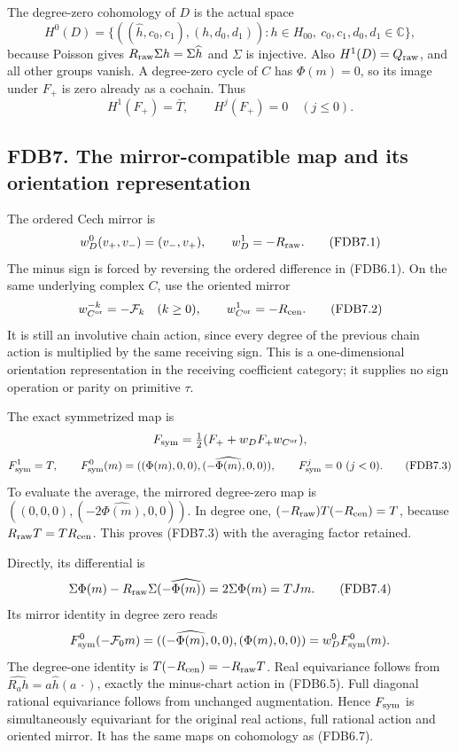 The degree-zero cohomology of \(D\) is the actual space \[
H^0(D)=\{((\widehat h,c_0,c_1),(h,d_0,d_1)):
h\in H_{00},\ c_0,c_1,d_0,d_1\in\mathbb C\},
\tag{FDB6.6}
\] because Poisson gives \(R_{\rm raw}\Sigma h=\Sigma\widehat h\) and
\(\Sigma\) is injective. Also \(H^1(D)=Q_{\rm raw}\), and all other
groups vanish. A degree-zero cycle of \(C\) has \(\Phi(m)=0\), so its
image under \(F_+\) is zero already as a cochain. Thus \[
H^1(F_+)=\bar T,\qquad H^j(F_+)=0\quad(j\le0).
\tag{FDB6.7}
\]

\subsection{FDB7. The mirror-compatible map and its orientation
representation}\label{fdb7.-the-mirror-compatible-map-and-its-orientation-representation}

The ordered Cech mirror is \[
w_D^0(v_+,v_-)=(v_-,v_+),\qquad
w_D^1=-R_{\rm raw}.
\tag{FDB7.1}
\] The minus sign is forced by reversing the ordered difference in
(FDB6.1). On the same underlying complex \(C\), use the oriented mirror
\[
w_{C^{\rm or}}^{-k}=-\mathcal F_k\quad(k\ge0),\qquad
w_{C^{\rm or}}^1=-R_{\rm cen}.
\tag{FDB7.2}
\] It is still an involutive chain action, since every degree of the
previous chain action is multiplied by the same receiving sign. This is
a one-dimensional orientation representation in the receiving
coefficient category; it supplies no sign operation or parity on
primitive \(\tau\).

The exact symmetrized map is \[
F_{\rm sym}=\tfrac12(F_++w_DF_+w_{C^{\rm or}}),
\] \[
F_{\rm sym}^1=T,\qquad
F_{\rm sym}^0(m)=((\Phi(m),0,0),(-\widehat{\Phi(m)},0,0)),
\qquad F_{\rm sym}^j=0\ (j<0).
\tag{FDB7.3}
\] To evaluate the average, the mirrored degree-zero map is
\(((0,0,0),(-2\widehat{\Phi(m)},0,0))\). In degree one,
\((-R_{\rm raw})T(-R_{\rm cen})=T\), because
\(R_{\rm raw}T=TR_{\rm cen}\). This proves (FDB7.3) with the averaging
factor retained.

Directly, its differential is \[
\Sigma\Phi(m)-R_{\rm raw}\Sigma(-\widehat{\Phi(m)})
=2\Sigma\Phi(m)=TJm.
\tag{FDB7.4}
\] Its mirror identity in degree zero reads \[
F_{\rm sym}^0(-\mathcal F_0m)
=((-\widehat{\Phi(m)},0,0),(\Phi(m),0,0))
=w_D^0F_{\rm sym}^0(m).
\] The degree-one identity is \(T(-R_{\rm cen})=-R_{\rm raw}T\). Real
equivariance follows from \(\widehat{R_a h}=a\widehat h(a\,\cdot)\),
exactly the minus-chart action in (FDB6.5). Full diagonal rational
equivariance follows from unchanged augmentation. Hence \(F_{\rm sym}\)
is simultaneously equivariant for the original real actions, full
rational action and oriented mirror. It has the same maps on cohomology
as (FDB6.7).

